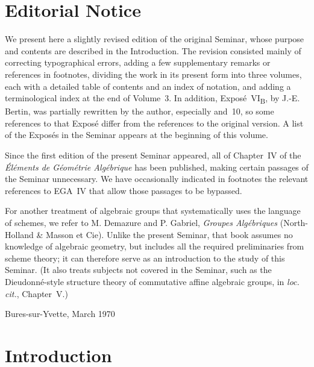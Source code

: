 
\begingroup
\newcommand{\SGAIIIIntroFootnote}[2]{%
  \begingroup
  \renewcommand{\thefootnote}{#1}%
  \footnote{#2}%
  \endgroup
}

\chapter*{Editorial Notice}

We present here a slightly revised edition of the original Seminar, whose purpose
and contents are described in the Introduction.  The revision consisted mainly of
correcting typographical errors, adding a few supplementary remarks or references
in footnotes, dividing the work in its present form into three volumes, each with a
detailed table of contents and an index of notation, and adding a terminological index at
the end of Volume~3.  In addition, Expos\'e~VI\textsubscript{B}, by J.-E. Bertin,
was partially rewritten by the author, especially  and~10, so some
references to that Expos\'e differ from the references to the original version.  A
list of the Expos\'es in the Seminar appears at the beginning of this volume.

Since the first edition of the present Seminar appeared, all of Chapter~IV of the
\emph{\'El\'ements de G\'eom\'etrie Alg\'ebrique} has been published, making certain
passages of the Seminar unnecessary.  We have occasionally indicated in footnotes
the relevant references to EGA~IV that allow those passages to be bypassed.

For another treatment of algebraic groups that systematically uses the language of
schemes, we refer to M. Demazure and P. Gabriel, \emph{Groupes Alg\'ebriques}
(North-Holland \& Masson et Cie).  Unlike the present Seminar, that book assumes no
knowledge of algebraic geometry, but includes all the required preliminaries from
scheme theory; it can therefore serve as an introduction to the study of this
Seminar.  (It also treats subjects not covered in the Seminar, such as the
Dieudonn\'e-style structure theory of commutative affine algebraic groups, in
\emph{loc. cit.}, Chapter~V.)

\begin{flushright}
Bures-sur-Yvette, March 1970
\end{flushright}

\clearpage
\thispagestyle{empty}
\mbox{}
\clearpage

\chapter*{Introduction}

